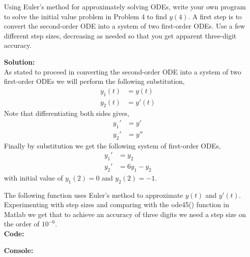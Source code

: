 \documentclass[12pt]{article}
\makeatletter
\theoremstyle{homework}
\newenvironment{exercise}[1]
{\def\@currentlabel{#1}\exercisecore}
{\endexercisecore}
\newcommand{\localhead}[1]{\par\smallskip\noindent\textbf{#1}\nobreak\\}%
\newcommand\solution{\localhead{Solution:}}
\makeatother
\begin{document}
\begin{exercise}{Problem P5} Using Euler's method for approximately solving ODEs, write your 
  own program to solve the initial value problem in Problem 4 to find $y(4)$. A first step is to convert the second-order ODE into a system of two first-order ODEs. Use a few different step sizes, decreasing as needed so that you get apparent three-digit accuracy.
  \solution As stated to proceed in converting the second-order ODE into a system of two first-order ODEs we will perform the following substitution, 
  \begin{align*}
    y_1(t) &= y(t)\\
    y_2(t) &= y'(t)
  \end{align*}
  Note that differentiating both sides gives, 
  \begin{align*}
    y_1' &= y'\\
    y_2' &= y''
  \end{align*}
  Finally by substitution we get the following system of first-order ODEs, 
  \begin{align*}
    y_1' &=  y_2\\
    y_2' &= 6y_1 - y_2
  \end{align*}
  with initial value of $y_1(2) = 0$ and $y_2(2) = -1$.

  The following function uses Euler's method to approximate $y(t)$ and $y'(t)$. Experimenting with step sizes and comparing with the ode45() function in Matlab we get that to achieve an accuracy of three digits we need a step size on the order of $10^{-6}$.\\

  \textbf{Code:}
  \begin{center}
    
  \end{center}

  \textbf{Console:}
  \begin{center}
    
  \end{center}


\end{exercise}
\vspace{1in}
\end{document}
